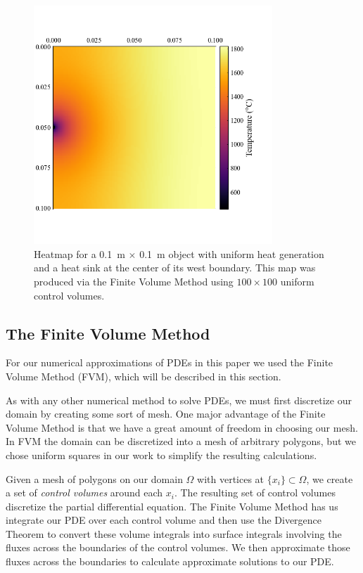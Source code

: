 \begin{figure}
	\centering
	\includegraphics[width=0.8\textwidth]{Chapter_I_Background/Images/Heatmap_Example.png}
	\caption[Heatmap Example]{Heatmap for a \SI{0.1}{\meter} $\times$ \SI{0.1}{\meter} object with uniform heat generation and a heat sink at the center of its west boundary. This map was produced via the Finite Volume Method using $100\times 100$ uniform control volumes.}
\end{figure}

\subsection{The Finite Volume Method}

For our numerical approximations of PDEs in this paper we used the Finite Volume Method (FVM), which will be described in this section.

As with any other numerical method to solve PDEs, we must first discretize our domain by creating some sort of mesh. One major advantage of the Finite Volume Method is that we have a great amount of freedom in choosing our mesh. In FVM the domain can be discretized into a mesh of arbitrary polygons, but we chose uniform squares in our work to simplify the resulting calculations.

Given a mesh of polygons on our domain $\Omega$ with vertices at $\lbrace x_i\rbrace\subset\Omega$, we create a set of {\color{baystate}\textit{control volumes}} around each $x_i$. The resulting set of control volumes discretize the partial differential equation. The Finite Volume Method has us integrate our PDE over each control volume and then use the {\color{tiananmen}Divergence Theorem} to convert these volume integrals into surface integrals involving the fluxes across the boundaries of the control volumes. We then approximate those fluxes across the boundaries to calculate approximate solutions to our PDE.

